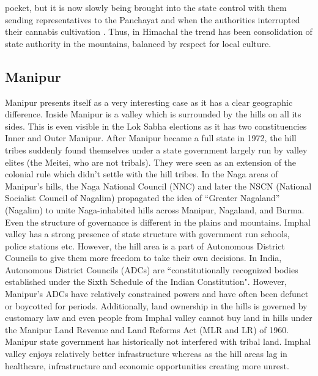 \begin{sloppypar}
pocket, but it is now slowly being brought into the state control with them sending representatives to the Panchayat and when the authorities interrupted their cannabis cultivation \citep{axelby2015hermit}. Thus, in Himachal the trend has been consolidation of state authority in the mountains, balanced by respect for local culture.

\end{sloppypar}
\subsection{Manipur}

Manipur presents itself as a very interesting case as it has a clear geographic difference. Inside Manipur is a valley which is surrounded by the hills on all its sides. This is even visible in the Lok Sabha elections as it has two constituencies Inner and Outer Manipur. After Manipur became a full state in 1972, the hill tribes suddenly found themselves under a state government largely run by valley elites (the Meitei, who are not tribals). They were seen as an extension of the colonial rule which didn't settle with the hill tribes.  In the Naga areas of Manipur’s hills, the Naga National Council (NNC) and later the NSCN (National Socialist Council of Nagalim) propagated the idea of ``Greater Nagaland” (Nagalim) to unite Naga\hyp{}inhabited hills across Manipur, Nagaland, and Burma. Even the structure of governance is different in the plains and mountains. Imphal valley has a strong presence of state structure with government run schools, police stations etc. However, the hill area is a part of Autonomous District Councils to give them more freedom to take their own decisions. In India, Autonomous District Councils (ADCs) are ``constitutionally recognized bodies established under the Sixth Schedule of the Indian Constitution". However, Manipur’s ADCs have relatively constrained powers and have often been defunct or boycotted for periods. Additionally, land ownership in the hills is governed by customary law and even people from Imphal valley cannot buy land in hills under the  Manipur Land Revenue and Land Reforms Act (MLR and LR) of 1960. Manipur state government has historically not interfered with tribal land. 
Imphal valley enjoys relatively better infrastructure whereas as the hill areas lag in healthcare, infrastructure and economic opportunities creating more unrest. \citep{lacina2009problem}

